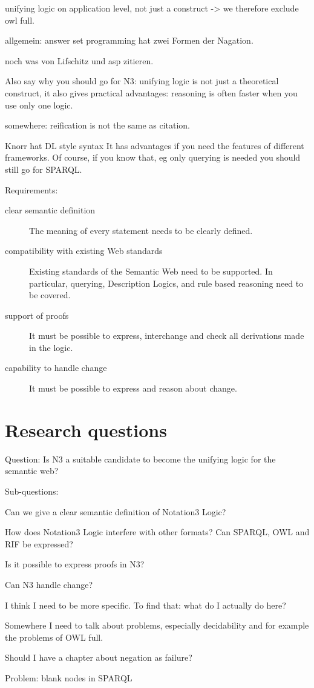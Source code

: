 unifying logic on application level, not just a construct -> we therefore exclude owl full.

allgemein: answer set programming hat zwei Formen der Nagation.

noch was von Lifschitz und asp zitieren.


Also say why you should go for N3: unifying logic is not just a theoretical construct, it also gives practical advantages: reasoning is often faster when you use only one logic.  

somewhere: reification is not the same as citation.

Knorr hat DL style syntax
It has advantages if you need 
the features of different frameworks. Of course, if you know that, eg only querying is needed you should still go for SPARQL.


Requirements:
\begin{description}
 \item[clear semantic definition] 
The meaning of every statement needs to be clearly defined.
 \item[compatibility with existing Web standards]  Existing standards of the Semantic Web need to be supported. 
 In particular, querying, Description Logics, and rule based reasoning need to be covered.
 \item[support of proofs] It must be possible to express, interchange and check all derivations made in the logic.
 \item[capability to handle change] It must be possible to express and reason about change.
\end{description}



\section{Research questions}
Question: Is N3 a suitable candidate to become the unifying logic for the semantic web?

Sub-questions:

Can we give a clear semantic definition of Notation3 Logic?

How does Notation3 Logic interfere with other formats? Can SPARQL, OWL and RIF be expressed?

Is it possible to express proofs in N3?

Can N3 handle change?

I think I need to be more specific. To find that: what do I actually do here?



% 
% 



Somewhere I need to talk about problems, especially decidability and for example the problems of OWL full.

Should I have a chapter about negation as failure?

Problem: blank nodes in SPARQL